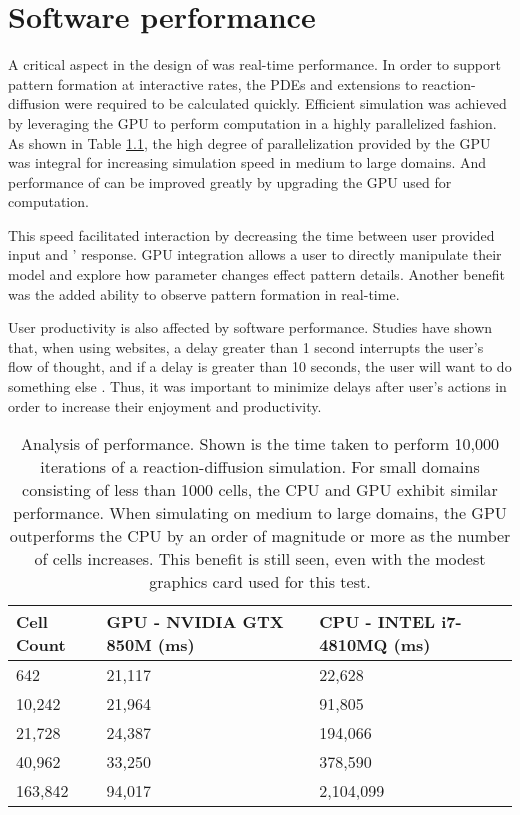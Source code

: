 \chapter{Software performance}
A critical aspect in the design of \ProgramName{} was real-time performance. In order to support pattern formation at interactive rates, the PDEs and extensions to reaction-diffusion were required to be calculated quickly. Efficient simulation was achieved by leveraging the GPU to perform computation in a highly parallelized fashion. As shown in Table \ref{tab:perf}, the high degree of parallelization provided by the GPU was integral for increasing simulation speed in medium to large domains.   And performance of \ProgramName{} can be improved greatly by upgrading the GPU used for computation.

This speed facilitated interaction by decreasing the time between user provided input and \ProgramName{}' response. GPU integration allows a user to directly manipulate their model and explore how parameter changes effect pattern details. Another benefit was the added ability to observe pattern formation in real-time.

User productivity is also affected by software performance. Studies have shown that, when using websites, a delay greater than 1 second interrupts the user's flow of thought, and if a delay is greater than 10 seconds, the user will want to do something else \citep{nielsen1994}. Thus, it was important to minimize delays after user's actions in order to increase their enjoyment and productivity.

\begin{table}[p]
	\centering
	\begin{tabular}{lll} \hline
	Cell Count & GPU - NVIDIA GTX 850M (ms)    & CPU - INTEL i7-4810MQ (ms)\\ \hline
	642      & 21,117 & 22,628    \\
	10,242   & 21,964 & 91,805    \\
	21,728   & 24,387 & 194,066   \\
	40,962   & 33,250 & 378,590   \\
	163,842  & 94,017 & 2,104,099 \\ \hline 
	\end{tabular}
	\caption[Analysis of \ProgramName{} performance]{Analysis of \ProgramName{} performance. Shown is the time taken to perform 10,000 iterations of a reaction-diffusion simulation. For small domains consisting of less than 1000 cells, the CPU and GPU exhibit similar performance. When simulating on medium to large domains, the GPU outperforms the CPU by an order of magnitude or more as the number of cells increases. This benefit is still seen, even with the modest graphics card used for this test.}
	\label{tab:perf}
\end{table}
